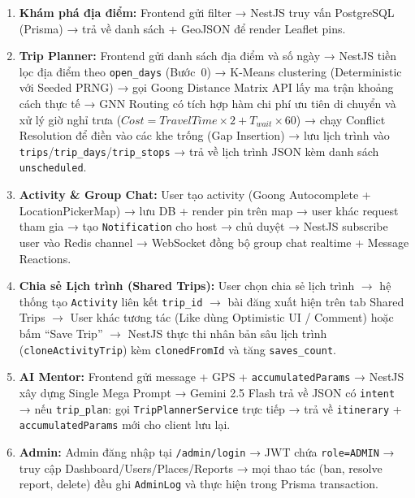 \documentclass[12pt,a4paper]{article}
\begin{document}
\begin{enumerate}
  \item \textbf{Khám phá địa điểm:} Frontend gửi filter → NestJS truy vấn
        PostgreSQL (Prisma) → trả về danh sách + GeoJSON để render Leaflet
        pins.

  \item \textbf{Trip Planner:} Frontend gửi danh sách địa điểm và số ngày →
        NestJS tiền lọc địa điểm theo \texttt{open\_days} (Bước~0) → K-Means
        clustering (Deterministic với Seeded PRNG) → gọi Goong Distance Matrix
        API lấy ma trận khoảng cách thực tế → GNN Routing có tích hợp hàm chi
        phí ưu tiên di chuyển và xử lý giờ nghỉ trưa
        ($Cost = TravelTime \times 2 + T_{wait} \times 60$) → chạy Conflict
        Resolution để điền vào các khe trống (Gap Insertion) → lưu lịch trình
        vào \texttt{trips}/\texttt{trip\_days}/\texttt{trip\_stops} → trả về
        lịch trình JSON kèm danh sách \texttt{unscheduled}.

  \item \textbf{Activity \& Group Chat:} User tạo activity (Goong Autocomplete
        + LocationPickerMap) → lưu DB + render pin trên map → user khác request
        tham gia → tạo \texttt{Notification} cho host → chủ duyệt → NestJS
        subscribe user vào Redis channel → WebSocket đồng bộ group chat
        realtime + Message Reactions.

  \item \textbf{Chia sẻ Lịch trình (Shared Trips):} User chọn chia sẻ lịch
        trình $\to$ hệ thống tạo \texttt{Activity} liên kết \texttt{trip\_id}
        $\to$ bài đăng xuất hiện trên tab Shared Trips $\to$ User khác tương
        tác (Like dùng Optimistic UI / Comment) hoặc bấm ``Save Trip'' $\to$
        NestJS thực thi nhân bản sâu lịch trình (\texttt{cloneActivityTrip})
        kèm \texttt{clonedFromId} và tăng \texttt{saves\_count}.

  \item \textbf{AI Mentor:} Frontend gửi message + GPS + \texttt{accumulatedParams}
        → NestJS xây dựng Single Mega Prompt → Gemini 2.5 Flash trả về JSON
        có \texttt{intent} → nếu \texttt{trip\_plan}: gọi
        \texttt{TripPlannerService} trực tiếp → trả về \texttt{itinerary} +
        \texttt{accumulatedParams} mới cho client lưu lại.

  \item \textbf{Admin:} Admin đăng nhập tại \texttt{/admin/login} → JWT chứa
        \texttt{role=ADMIN} → truy cập Dashboard/Users/Places/Reports → mọi
        thao tác (ban, resolve report, delete) đều ghi \texttt{AdminLog} và
        thực hiện trong Prisma transaction.
\end{enumerate}
\end{document}
